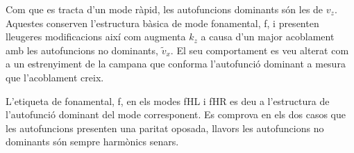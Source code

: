 Com que es tracta d'un mode ràpid, les autofuncions dominants són les de $v_z$. Aquestes conserven l'estructura bàsica de mode fonamental, f,
i presenten lleugeres modificacions així com augmenta $k_z$ a causa d'un major acoblament amb les autofuncions no dominants, $\tilde{v}_{x}$.
El seu comportament es veu alterat com a un estrenyiment de la campana que conforma l'autofunció dominant a mesura que l'acoblament creix.

L'etiqueta de fonamental, f, en els modes fHL i fHR es deu a l'estructura de l'autofunció dominant del mode corresponent.
Es comprova en els dos casos que les autofuncions presenten una paritat oposada, llavors les autofuncions no dominants són sempre harmònics senars.
